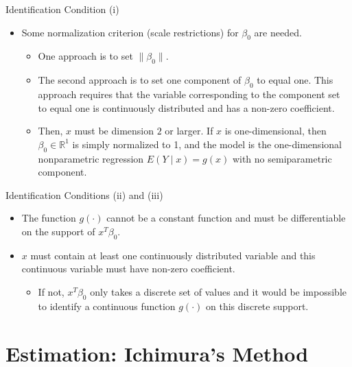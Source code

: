 \documentclass[xcolor=svgnames,dvipdfmx,cjk]{beamer}
\theoremstyle{example}
\begin{document}
\begin{frame}{Identification Condition (i)}
  \begin{itemize}
    \item Some normalization criterion (scale restrictions) for $\beta_0$ are needed.
          \begin{itemize}
            \item One approach is to set $\| \beta_0 \|$.
            \item The second approach is to set one component of $\beta_0$ to equal one. 
                  This approach requires that 
                  the variable corresponding to the component set to equal one 
                  is continuously distributed 
                  and has a non-zero coefficient.
            \item Then, $x$ must be dimension $2$ or larger. 
                  If $x$ is one-dimensional, then $\beta_0 \in \mathbb{R}^1$ is simply normalized to 1, 
                  and the model is the one-dimensional nonparametric regression $E(Y \mid x) = g(x)$ with no semiparametric component.
          \end{itemize}
  \end{itemize}
  
\end{frame}

\begin{frame}{Identification Conditions (ii) and (iii)}
\begin{itemize}
  \item The function $g(\cdot)$ cannot be a constant function and must be differentiable on the support of $x^{T}\beta_0$.
  \item $x$ must contain at least one continuously distributed variable
        and this continuous variable must have non-zero coefficient.
        \begin{itemize}
          \item  If not, $x^{T} \beta_0$ only takes a discrete set of values and it would be impossible to identify a continuous function $g(\cdot)$ on this discrete support.
        \end{itemize}
\end{itemize}
\end{frame}


\section{Estimation: Ichimura's Method}
\end{document}
